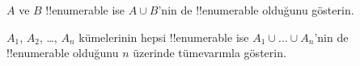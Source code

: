 \documentclass[../../../include/open-logic-section]{subfiles}
\begin{document}
\begin{prob}
$A$ ve $B$ !!{enumerable} ise $A\cup B$'nin de !!{enumerable} olduğunu
gösterin.
\end{prob}

\begin{prob}
$A_1$, $A_2$, \dots, $A_n$ kümelerinin hepsi !!{enumerable} ise
$A_1\cup\dots\cup A_n$'nin de !!{enumerable} olduğunu $n$ üzerinde
tümevarımla gösterin.
\end{prob}
\end{document}
